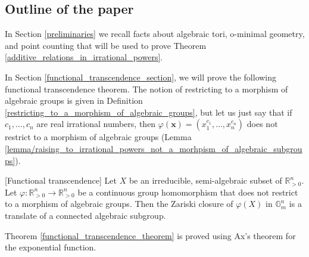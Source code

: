 \documentclass[9pt]{amsart}
\theoremstyle{my_theorem_style}
\numberwithin{definition}{section}
\newenvironment{manualtheorem}[1]{%
  \IfBlankTF{#1}
    {\renewcommand{\themanualtheoreminner}{\unskip}}
    {\renewcommand\themanualtheoreminner{#1}}%
  \manualtheoreminner
}{\endmanualtheoreminner}
\newcommand{\G}{\mathbb{G}}
\renewcommand{\phi}{\varphi}
\newcommand{\R}{\mathbb{R}}
\renewcommand{\vec}[1]{\bm{#1}}
\begin{document}
\subsection{Outline of the paper}
\label{outline_of_the_paper}

In Section \ref{preliminaries} we recall facts about algebraic tori, o-minimal geometry, and point counting that will be used to prove Theorem \ref{additive_relations_in_irrational_powers}.

In Section \ref{functional_transcendence_section}, we will prove the following functional transcendence theorem. The notion of restricting to a morphism of algebraic groups is given in Definition \ref{restricting_to_a_morphism_of_algebraic_groups}, but let us just say that if $c_1, \dots, c_n$ are real irrational numbers, then $\phi(\vec{x}) = (x_1^{c_1}, \dots, x_n^{c_n})$ does not restrict to a morphism of algebraic groups (Lemma \ref{lemma/raising_to_irrational_powers_not_a_morhpism_of_algebraic_subgroups}).

\begin{manualtheorem}{3.4}
    [Functional transcendence]
    Let $X$ be an irreducible, semi-algebraic subset of $\R_{>0}^n$. Let $\phi : \R_{>0}^n \to \R_{>0}^n$ be a continuous group homomorphism that does not restrict to a morphism of algebraic groups. Then the Zariski closure of $\phi(X)$ in $\G_m^n$ is a translate of a connected algebraic subgroup.
\end{manualtheorem}

Theorem \ref{functional_transcendence_theorem} is proved using Ax's theorem \cite[Theorem 3]{Ax_on_Schanuel's_conjectures} for the exponential function.
\end{document}
